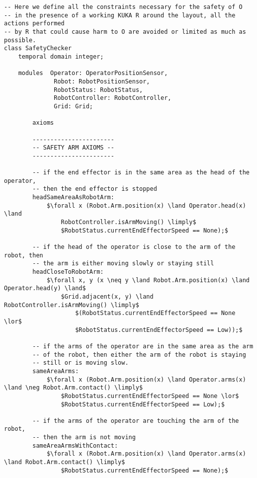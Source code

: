\begin{lstlisting}[fontadjust, mathescape, frame=single]
-- Here we define all the constraints necessary for the safety of O 
-- in the presence of a working KUKA R around the layout, all the actions performed 
-- by R that could cause harm to O are avoided or limited as much as possible. 
class SafetyChecker
    temporal domain integer;

    modules  Operator: OperatorPositionSensor,
              Robot: RobotPositionSensor,
              RobotStatus: RobotStatus,
              RobotController: RobotController,
              Grid: Grid;
    
        axioms
    
        -----------------------
        -- SAFETY ARM AXIOMS --
        -----------------------
        
        -- if the end effector is in the same area as the head of the operator,
        -- then the end effector is stopped
        headSameAreaAsRobotArm:
            $\forall x (Robot.Arm.position(x) \land Operator.head(x) \land
                RobotController.isArmMoving() \limply$
                $RobotStatus.currentEndEffectorSpeed == None);$

        -- if the head of the operator is close to the arm of the robot, then
        -- the arm is either moving slowly or staying still
        headCloseToRobotArm:
            $\forall x, y (x \neq y \land Robot.Arm.position(x) \land Operator.head(y) \land$
                $Grid.adjacent(x, y) \land RobotController.isArmMoving() \limply$
                    $(RobotStatus.currentEndEffectorSpeed == None \lor$
                    $RobotStatus.currentEndEffectorSpeed == Low));$

        -- if the arms of the operator are in the same area as the arm
        -- of the robot, then either the arm of the robot is staying
        -- still or is moving slow.
        sameAreaArms:
            $\forall x (Robot.Arm.position(x) \land Operator.arms(x) \land \neg Robot.Arm.contact() \limply$
                $RobotStatus.currentEndEffectorSpeed == None \lor$
                $RobotStatus.currentEndEffectorSpeed == Low);$

        -- if the arms of the operator are touching the arm of the robot,
        -- then the arm is not moving
        sameAreaArmsWithContact:
            $\forall x (Robot.Arm.position(x) \land Operator.arms(x) \land Robot.Arm.contact() \limply$
                $RobotStatus.currentEndEffectorSpeed == None);$


\end{lstlisting}
